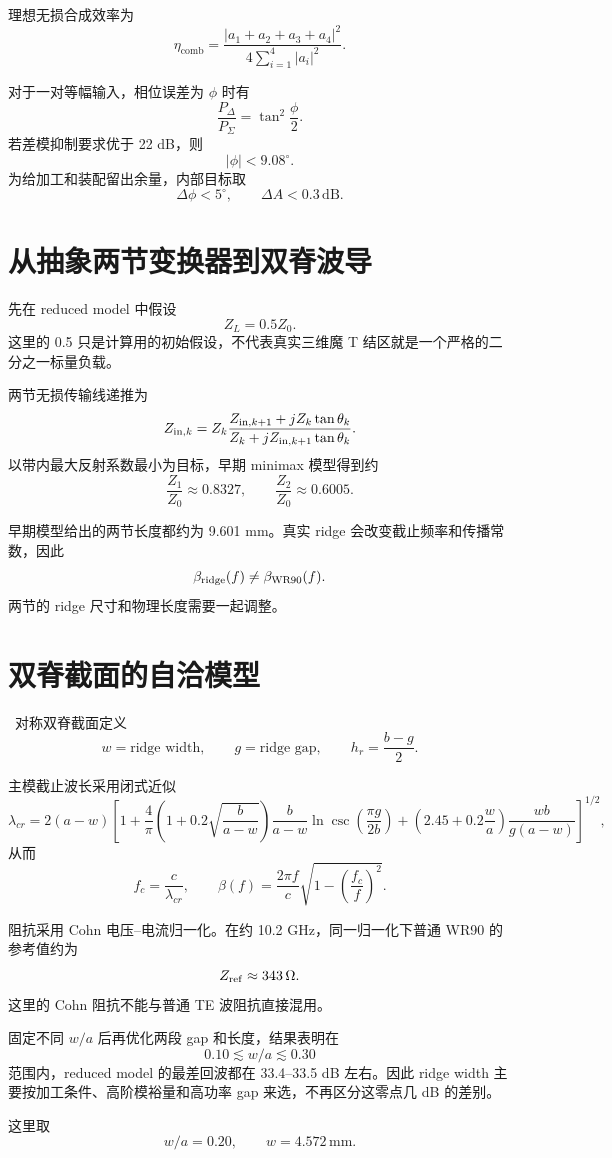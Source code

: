 \documentclass[11pt,a4paper]{ctexart}
\begin{document}
理想无损合成效率为
\[
\eta_{\mathrm{comb}}
=
\frac{
\left|a_1+a_2+a_3+a_4\right|^2
}{
4\sum_{i=1}^{4}|a_i|^2
}.
\]

对于一对等幅输入，相位误差为 \(\phi\) 时有
\[
\frac{P_\Delta}{P_\Sigma}
=
\tan^2\frac{\phi}{2}.
\]
若差模抑制要求优于 22 dB，则
\[
|\phi|<9.08^\circ.
\]
为给加工和装配留出余量，内部目标取
\[
\boxed{\Delta\phi<5^\circ},
\qquad
\boxed{\Delta A<0.3\,\mathrm{dB}}.
\]

\section{从抽象两节变换器到双脊波导}

先在 reduced model 中假设
\[
Z_L=0.5Z_0.
\]
这里的 0.5 只是计算用的初始假设，不代表真实三维魔 T 结区就是一个严格的二分之一标量负载。

两节无损传输线递推为
\[
Z_{{\rm in},k}
=
Z_k
\frac{
Z_{{\rm in},k+1}+jZ_k\tan\theta_k
}{
Z_k+jZ_{{\rm in},k+1}\tan\theta_k
}.
\]
以带内最大反射系数最小为目标，早期 minimax 模型得到约
\[
\frac{Z_1}{Z_0}\approx0.8327,
\qquad
\frac{Z_2}{Z_0}\approx0.6005.
\]

早期模型给出的两节长度都约为 9.601 mm。真实 ridge 会改变截止频率和传播常数，因此
\[
\beta_{\rm ridge}(f)\neq\beta_{\rm WR90}(f).
\]
两节的 ridge 尺寸和物理长度需要一起调整。

\section{双脊截面的自洽模型}
\
对称双脊截面定义
\[
w=\text{ridge width},
\qquad
g=\text{ridge gap},
\qquad
h_r=\frac{b-g}{2}.
\]

主模截止波长采用闭式近似
\[
\lambda_{cr}
=
2(a-w)
\left[
1+
\frac{4}{\pi}
\left(1+0.2\sqrt{\frac{b}{a-w}}\right)
\frac{b}{a-w}
\ln\csc\left(\frac{\pi g}{2b}\right)
+
\left(2.45+0.2\frac{w}{a}\right)
\frac{wb}{g(a-w)}
\right]^{1/2},
\]
从而
\[
f_c=\frac{c}{\lambda_{cr}},
\qquad
\beta(f)
=
\frac{2\pi f}{c}
\sqrt{1-\left(\frac{f_c}{f}\right)^2}.
\]

阻抗采用 Cohn 电压--电流归一化。在约 10.2 GHz，同一归一化下普通 WR90 的参考值约为
\[
Z_{\rm ref}\approx343\,\Omega.
\]
这里的 Cohn 阻抗不能与普通 TE 波阻抗直接混用。

固定不同 \(w/a\) 后再优化两段 gap 和长度，结果表明在
\[
0.10\lesssim w/a\lesssim0.30
\]
范围内，reduced model 的最差回波都在 33.4--33.5 dB 左右。因此 ridge width 主要按加工条件、高阶模裕量和高功率 gap 来选，不再区分这零点几 dB 的差别。

这里取
\[
\boxed{w/a=0.20},
\qquad
\boxed{w=4.572\,\mathrm{mm}}.
\]
\end{document}
